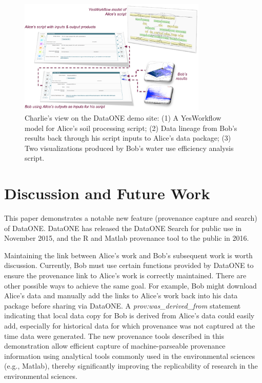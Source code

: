 \documentclass[a4paper]{llncs}
\begin{document}
\begin{figure}[t]
\centering   
\includegraphics[width=0.8\textwidth]{figs/abc-crop}
\caption{Charlie's view on the DataONE demo site: (1) A YesWorkflow model for Alice's soil processing script; (2) Data lineage from Bob's results back through his script inputs to Alice's data package; (3) Two visualizations produced by Bob's water use efficiency analysis script.}
\label{fig2}
\end{figure}


\section{Discussion and Future Work}

This paper demonstrates a notable new feature (provenance capture and search) of DataONE. DataONE has released the DataONE Search for public use in November 2015, and the R and Matlab provenance tool to the public in 2016. 

Maintaining the link between Alice's work and Bob's subsequent work is worth discussion. Currently, Bob must use certain functions provided by DataONE to ensure the provenance link to Alice's work is correctly maintained. There are other possible ways to achieve the same goal. For example,  Bob might download Alice's data and manually add the links to Alice's work back into his data package before sharing via DataONE. A \emph{prov:was\_derived\_from} statement indicating that local data copy for Bob is derived from Alice's data could easily add, especially for historical data for which provenance was not captured at the time data were generated.  The new provenance tools described in this demonstration allow efficient capture of machine-parseable provenance information using analytical tools commonly used in the environmental sciences (e.g., Matlab), thereby significantly improving the replicability of research in the environmental sciences.
\end{document}
